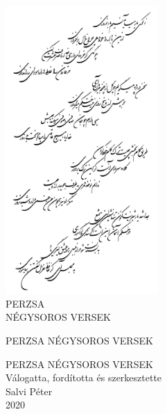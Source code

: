 

\frontmatter
{}

\begin{titlepage}
\centering
\includegraphics[width=5.8cm]{hafez.png}\\
\vspace{\fill}
\Large PERZSA\\NÉGYSOROS VERSEK
\end{titlepage}

\thispagestyle{empty}
\newpage

\begin{titlepage}
\thispagestyle{plain}
\centering
\vspace*{2cm}
{\large PERZSA NÉGYSOROS VERSEK}
\end{titlepage}

\thispagestyle{empty}
\newpage

\begin{titlepage}
\thispagestyle{plain}
\centering
\vspace*{2cm}
{\Large PERZSA NÉGYSOROS VERSEK}\\
\vspace{7cm}
{\large Válogatta, fordította és szerkesztette}\\
\vspace{1em}
{\large Salvi Péter}\\
\vspace{1em}
2020
\end{titlepage}

